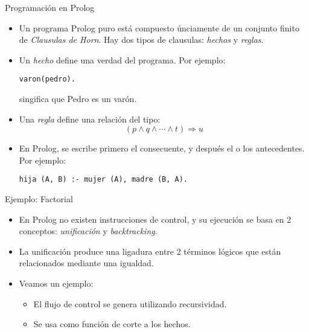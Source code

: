 \documentclass[xcolor=dvipsnames]{beamer}
\begin{document}
\begin{frame}[fragile]{Programación en Prolog}

\begin{itemize}
 \item Un programa Prolog puro está compuesto únciamente de un conjunto finito de \textit{Clausulas de Horn}. Hay dos tipos de clausulas: \textit{hechos} y \textit{reglas}.
 \item Un \textit{hecho} define una verdad del programa. Por ejemplo:
\begin{lstlisting}
varon(pedro).
\end{lstlisting}
singifica que Pedro es un varón.

 \item Una \textit{regla} define una relación del tipo: 
\[
(p \wedge q \wedge \cdots \wedge t) \Rightarrow u
\]
 \item En Prolog, se escribe primero el consecuente, y después el o los antecedentes. Por ejemplo:
\begin{lstlisting}
hija (A, B) :- mujer (A), madre (B, A).
\end{lstlisting}
\end{itemize}

\end{frame}


\begin{frame}[fragile]{Ejemplo: Factorial}
 
\begin{itemize}
 \item En Prolog no existen instrucciones de control, y su ejecución se basa en 2 conceptos: \textit{unificación} y \textit{backtracking}. 
 \item La unificación produce una ligadura entre 2 términos lógicos que están relacionados mediante una igualdad.
 \item Veamos un ejemplo:

\begin{itemize}
 \item El flujo de control se genera utilizando recursividad.
 \item Se usa como función de corte a los hechos. 
\end{itemize}
\end{itemize}



\end{frame}
\end{document}
